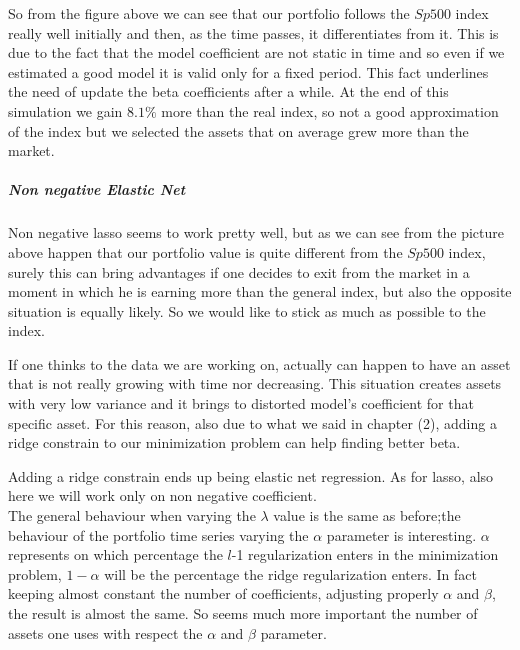 \documentclass{article}%
\begin{document}
   

So from the figure above we can see that our portfolio follows the $Sp500$ index really well initially and then, as the time passes, it differentiates from it. This is due to the fact that the model coefficient are not static in time and so even if we estimated a good model it is valid only for a fixed period. This fact underlines the need of update the beta coefficients after a while. At the end of this simulation we gain $8.1\%$ more than the real index, so not a good approximation of the index but we selected the assets that on average grew more than the market.

\subparagraph{Non negative Elastic Net}
Non negative lasso seems to work pretty well, but as we can see from the picture above happen that our portfolio value is quite different from the $Sp500$ index, surely this can bring advantages if one decides to exit from the market in a moment in which he is earning more than the general index, but also the opposite situation is equally likely. So we would like to stick as much as possible to the index.

If one thinks to the data we are working on, actually can happen to have an asset that is not really growing with time nor decreasing. This situation creates assets with very low variance and it brings to distorted model's coefficient for that specific asset. For this reason, also due to what we said in chapter (2), adding a ridge constrain to our minimization problem can help finding better beta.

Adding a ridge constrain ends up being elastic net regression. As for lasso, also here we will work only on non negative coefficient.
\\

The general behaviour when varying the $\lambda$ value is the same as before;the behaviour of the portfolio time series varying the $\alpha$ parameter is interesting. $\alpha$ represents on which percentage the $l$-1 regularization enters in the minimization problem, $1-\alpha$ will be the percentage the ridge regularization enters. In fact keeping almost constant the number of coefficients, adjusting properly $\alpha$ and $\beta$, the result is almost the same. So seems much more important the number of assets one uses with respect the $\alpha$ and $\beta$ parameter.
\\
\end{document}
